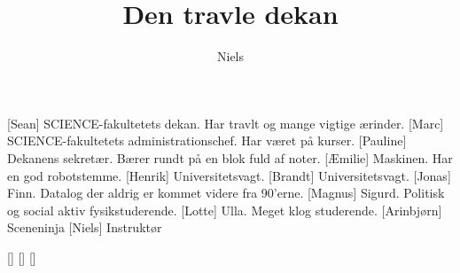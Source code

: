 \documentclass[a4paper,11pt]{article}
\title{Den travle dekan}
\author{Niels}
\begin{document}
\maketitle

\begin{roles}
[Sean] SCIENCE-fakultetets dekan.  Har travlt og mange vigtige ærinder.
[Marc] SCIENCE-fakultetets administrationschef.  Har været på kurser.
[Pauline] Dekanens sekretær.  Bærer rundt på en blok fuld af noter.
[Æmilie] Maskinen.  Har en god robotstemme.
[Henrik] Universitetsvagt.
[Brandt] Universitetsvagt.
[Jonas] Finn.  Datalog der aldrig er kommet videre fra 90'erne.
[Magnus] Sigurd.  Politisk og social aktiv fysikstuderende.
[Lotte] Ulla.  Meget klog studerende.
[Arinbjørn] Sceneninja
[Niels] Instruktør
\end{roles}

\begin{props}
[]
[]
[]
\end{props}
\end{document}
